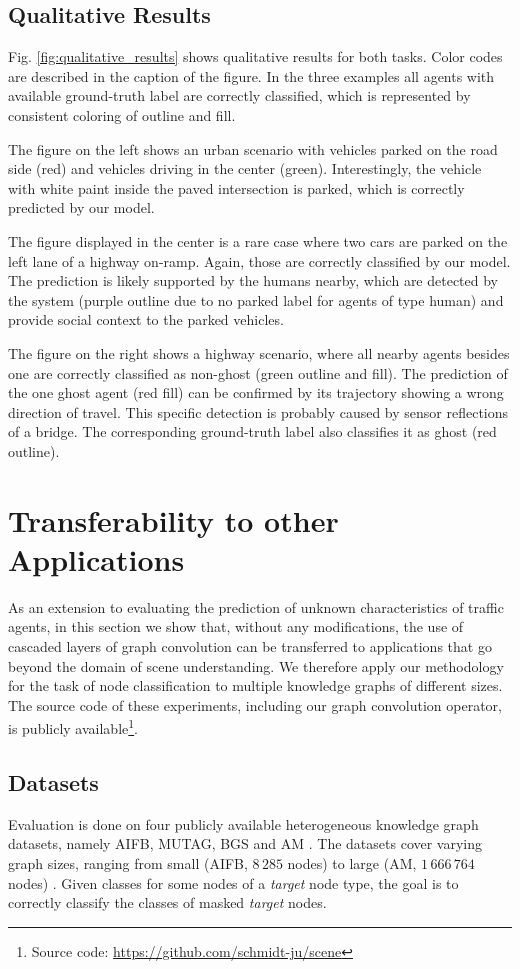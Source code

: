 \documentclass[letterpaper, 10 pt, journal, twoside]{IEEEtran}
\begin{document}
\subsection{Qualitative Results}
Fig. \ref{fig:qualitative_results} shows qualitative results for both tasks.
Color codes are described in the caption of the figure.
In the three examples all agents with available ground-truth label are correctly classified, which is represented by consistent coloring of outline and fill.

The figure on the left shows an urban scenario with vehicles parked on the road side (red) and vehicles driving in the center (green).
Interestingly, the vehicle with white paint inside the paved intersection is parked, which is correctly predicted by our model.

The figure displayed in the center is a rare case where two cars are parked on the left lane of a highway on-ramp.
Again, those are correctly classified by our model.
The prediction is likely supported by the humans nearby, which are detected by the system (purple outline due to no parked label for agents of type human) and provide social context to the parked vehicles.

The figure on the right shows a highway scenario, where all nearby agents besides one are correctly classified as non-ghost (green outline and fill).
The prediction of the one ghost agent (red fill) can be confirmed by its trajectory showing a wrong direction of travel.
This specific detection is probably caused by sensor reflections of a bridge. The corresponding ground-truth label also classifies it as ghost (red outline).

\section{Transferability to other Applications}
As an extension to evaluating the prediction of unknown characteristics of traffic agents, in this section we show that, without any modifications, the use of cascaded layers of graph convolution can be transferred to applications that go beyond the domain of scene understanding.
We therefore apply our methodology for the task of node classification to multiple knowledge graphs of different sizes.
The source code of these experiments, including our graph convolution operator, is publicly available\footnote[3]{Source code: \url{https://github.com/schmidt-ju/scene}}.

\subsection{Datasets}
Evaluation is done on four publicly available heterogeneous knowledge graph datasets, namely AIFB, MUTAG, BGS and AM \cite{Ristoski2016}.
The datasets cover varying graph sizes, ranging from small (AIFB, $8\,285$ nodes) to large (AM, $1\,666\,764$ nodes) \cite{Schlichtkrull2018}.
Given classes for some nodes of a \textit{target} node type, the goal is to correctly classify the classes of masked \textit{target} nodes.
\end{document}
